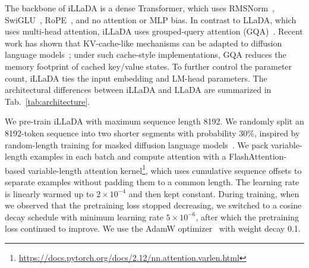 \documentclass{llmxive}
\begin{document}
The backbone of iLLaDA is a dense Transformer, which uses RMSNorm~\citep{zhang2019root}, SwiGLU~\citep{shazeer2020glu}, RoPE~\citep{su2024roformer}, and no attention or MLP bias. In contrast to LLaDA, which uses multi-head attention, iLLaDA uses grouped-query attention (GQA)~\citep{ainslie2023gqa}. Recent work has shown that KV-cache-like mechanisms can be adapted to diffusion language models~\citep{ma2025dkvcache,nguyentri2025attention,cheong2026entropycache,yang2025diffusionvar,qian2026d3llm}; under such cache-style implementations, GQA reduces the memory footprint of cached key/value states. To further control the parameter count, iLLaDA ties the input embedding and LM-head parameters. The architectural differences between iLLaDA and LLaDA are summarized in Tab.~\ref{tab:architecture}.


We pre-train iLLaDA with maximum sequence length 8192. We randomly split an 8192-token sequence into two shorter segments with probability \(30\%\), inspired by random-length training for masked diffusion language models~\citep{nie2024scaling}. We pack variable-length examples in each batch and compute attention with a FlashAttention-based variable-length attention kernel\footnote{\url{https://docs.pytorch.org/docs/2.12/nn.attention.varlen.html}}, which uses cumulative sequence offsets to separate examples without padding them to a common length. The learning rate is linearly warmed up to \(2 \times 10^{-4}\) and then kept constant. During training, when we observed that the pretraining loss stopped decreasing, we switched to a cosine decay schedule with minimum learning rate \(5 \times 10^{-6}\), after which the pretraining loss continued to improve. We use the AdamW optimizer~\citep{loshchilov2017decoupled} with weight decay 0.1.
\end{document}
